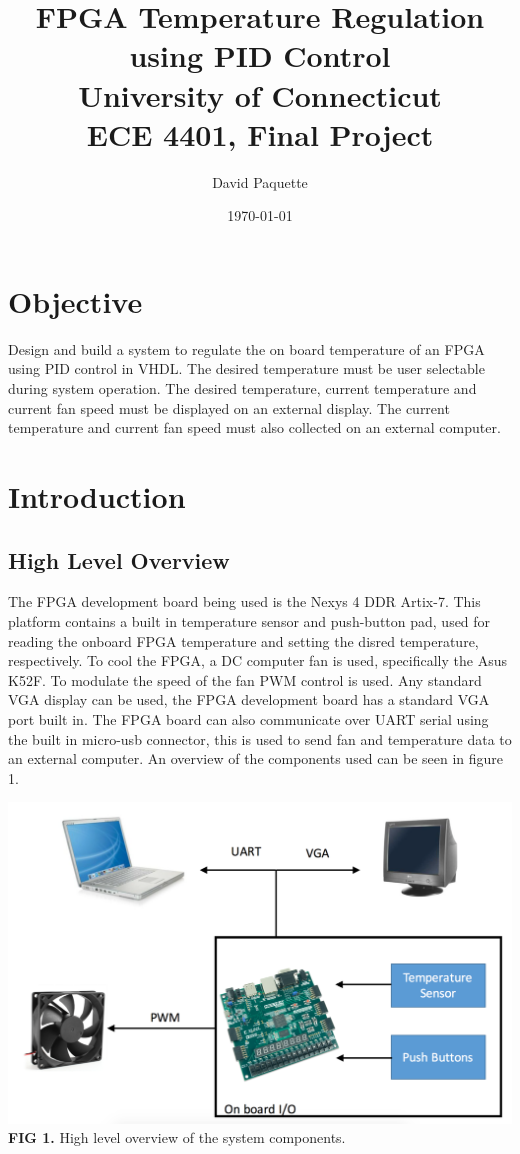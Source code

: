 \documentclass{article}
\title{\textbf{FPGA Temperature Regulation using PID Control \\  University of Connecticut \\ ECE 4401, Final Project}}
\author{David Paquette}
\date{\today}
\begin{document}
\maketitle

\tableofcontents{}
\newpage
\section{Objective}
Design and build a system to regulate the on board temperature of an FPGA using PID control in VHDL. The desired temperature must be user selectable during system operation. The desired temperature, current temperature and current fan speed must be displayed on an external display. The current temperature and current fan speed must also collected on an external computer.

\section{Introduction}
\subsection{High Level Overview}
The FPGA development board being used is the Nexys 4 DDR Artix-7. This platform contains a built in temperature sensor and push-button pad, used for reading the onboard FPGA temperature and setting the disred temperature, respectively. To cool the FPGA, a DC computer fan is used, specifically the Asus K52F. To modulate the speed of the fan PWM control is used. Any standard VGA display can be used, the FPGA development board has a standard VGA port built in. The FPGA board can also communicate over UART serial using the built in micro-usb connector, this is used to send fan and temperature data to an external computer. An overview of the components used can be seen in figure 1.
\begin{center}
\includegraphics[scale=.4]{images/Overview}\\
\textbf{FIG 1.} High level overview of the system components.\\
\end{center}
\end{document}

